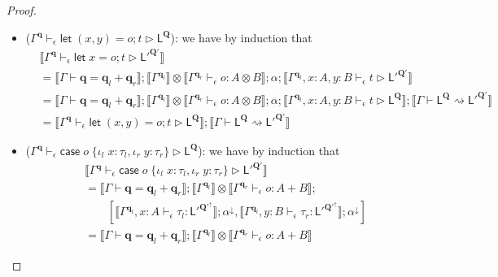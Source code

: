 \documentclass[acmsmall,screen,anonymous,review]{acmart}
\newcommand{\mb}[1]{\ensuremath{\mathbf{#1}}}
\newcommand{\ms}[1]{\ensuremath{\mathsf{#1}}}
\newcommand{\lto}{:}
\newcommand{\linl}[1]{\iota_l\;{#1}}
\newcommand{\linr}[1]{\iota_r\;{#1}}
\newcommand{\letstmt}[3]{\ensuremath{\ms{let}\;#1 = #2; #3}}
\newcommand{\casestmt}[5]{\ms{case}\;#1\;\{\linl{#2} \lto #3, \linr{#4} \lto #5\}}
\newcommand{\qsp}[4]{#1 \vdash #2 = #3 + #4}
\newcommand{\lwk}[3]{#1 \vdash #2 \rightsquigarrow #3}
\newcommand{\hasty}[4]{#1 \vdash_{#2} #3: {#4}}
\newcommand{\haslb}[4]{#1 \vdash_{#2} #3 \rhd #4}
\newcommand{\dnt}[1]{\llbracket{#1}\rrbracket}
\newcommand{\zeroqv}[1]{#1^\uparrow}
\begin{document}
\begin{proof}
\begin{itemize}
\begin{align*}
      ; \dnt{\haslb{\Gamma^{\mb{q}_l}, x : A}{\epsilon}{t}{\ms{L}^{\mb{Q}}}}
      ; \dnt{\lwk{\Gamma}{\ms{L}^{\mb{Q}}}{\ms{L}'^{\mb{Q}'}}} \\
    &= \dnt{\haslb{\Gamma^{\mb{q}}}{\epsilon}{\letstmt{x}{o}{t}}{\ms{L}^{\mb{Q}}}}
      ; \dnt{\lwk{\Gamma}{\ms{L}^{\mb{Q}}}{\ms{L}'^{\mb{Q}'}}}
    \end{align*}
    \item ($\haslb{\Gamma^{\mb{q}}}{\epsilon}{\letstmt{(x, y)}{o}{t}}{\ms{L}^{\mb{Q}}}$):
    we have by induction that
    \begin{align*}
    &\dnt{\haslb{\Gamma^{\mb{q}}}{\epsilon}{\letstmt{x}{o}{t}}{\ms{L}'^{\mb{Q}'}}} \\
    &= \dnt{\qsp{\Gamma}{\mb{q}}{\mb{q}_l}{\mb{q}_r}} 
      ; \dnt{\Gamma^{\mb{q}_l}} \otimes \dnt{\hasty{\Gamma^{\mb{q}_r}}{\epsilon}{o}{A \otimes B}}
      ; \alpha ; \dnt{\haslb{\Gamma^{\mb{q}_l}, x : A, y : B}{\epsilon}{t}{\ms{L}'^{\mb{Q}'}}}\\
    &= \dnt{\qsp{\Gamma}{\mb{q}}{\mb{q}_l}{\mb{q}_r}} 
      ; \dnt{\Gamma^{\mb{q}_l}} \otimes \dnt{\hasty{\Gamma^{\mb{q}_r}}{\epsilon}{o}{A \otimes B}}
      ; \alpha ; \dnt{\haslb{\Gamma^{\mb{q}_l}, x : A, y : B}{\epsilon}{t}{\ms{L}^{\mb{Q}}}}
      ; \dnt{\lwk{\Gamma}{\ms{L}^{\mb{Q}}}{\ms{L}'^{\mb{Q}'}}} \\
    &= \dnt{\haslb{\Gamma^{\mb{q}}}{\epsilon}{\letstmt{(x, y)}{o}{t}}{\ms{L}^{\mb{Q}}}}
      ; \dnt{\lwk{\Gamma}{\ms{L}^{\mb{Q}}}{\ms{L}'^{\mb{Q}'}}}
    \end{align*}
    \item
    ($\haslb{\Gamma^{\mb{q}}}{\epsilon}{\casestmt{o}{x}{\tau_l}{y}{\tau_r}}{\ms{L}^{\mb{Q}}}$):
    we have by induction that
    \begin{align*}
    &\dnt{\haslb{\Gamma^{\mb{q}}}{\epsilon}{\casestmt{o}{x}{\tau_l}{y}{\tau_r}}{\ms{L}'^{\mb{Q}'}}} 
      \\
    &= \dnt{\qsp{\Gamma}{\mb{q}}{\mb{q}_l}{\mb{q}_r}} 
      ; \dnt{\Gamma^{\mb{q}_l}} \otimes \dnt{\hasty{\Gamma^{\mb{q}_r}}{\epsilon}{o}{A + B}}
      ; \\ & \qquad [
      \dnt{\hasty{\Gamma^{\mb{q}_l}, x : A}{\epsilon}{\tau_l}{\ms{L}'^{\zeroqv{\mb{Q}'}}}}
        ; \alpha^\downarrow,
      \dnt{\hasty{\Gamma^{\mb{q}_l}, y : B}{\epsilon}{\tau_r}{\ms{L}'^{\zeroqv{\mb{Q}'}}}}
        ; \alpha^\downarrow
    ] \\
    &= \dnt{\qsp{\Gamma}{\mb{q}}{\mb{q}_l}{\mb{q}_r}} 
      ; \dnt{\Gamma^{\mb{q}_l}} \otimes \dnt{\hasty{\Gamma^{\mb{q}_r}}{\epsilon}{o}{A + B}}

\end{align*}
\end{itemize}
\end{proof}
\end{document}
